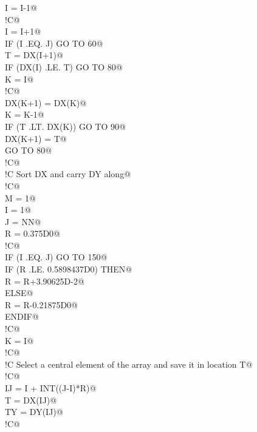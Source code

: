 \documentclass[10pt,a4paper,notitlepage]{article}
\begin{document}
\begin{flushleft}
\begin{list}{}{}
\mbox{}\verb@      I = I-1@\\
\mbox{}\verb@!C@\\
\mbox{} I = I+1@\\
\mbox{}\verb@      IF (I .EQ. J) GO TO 60@\\
\mbox{}\verb@      T = DX(I+1)@\\
\mbox{}\verb@      IF (DX(I) .LE. T) GO TO 80@\\
\mbox{}\verb@      K = I@\\
\mbox{}\verb@!C@\\
\mbox{} DX(K+1) = DX(K)@\\
\mbox{}\verb@      K = K-1@\\
\mbox{}\verb@      IF (T .LT. DX(K)) GO TO 90@\\
\mbox{}\verb@      DX(K+1) = T@\\
\mbox{}\verb@      GO TO 80@\\
\mbox{}\verb@!C@\\
\mbox{}\verb@!C     Sort DX and carry DY along@\\
\mbox{}\verb@!C@\\
\mbox{} M = 1@\\
\mbox{}\verb@      I = 1@\\
\mbox{}\verb@      J = NN@\\
\mbox{}\verb@      R = 0.375D0@\\
\mbox{}\verb@!C@\\
\mbox{} IF (I .EQ. J) GO TO 150@\\
\mbox{}\verb@      IF (R .LE. 0.5898437D0) THEN@\\
\mbox{}\verb@         R = R+3.90625D-2@\\
\mbox{}\verb@      ELSE@\\
\mbox{}\verb@         R = R-0.21875D0@\\
\mbox{}\verb@      ENDIF@\\
\mbox{}\verb@!C@\\
\mbox{} K = I@\\
\mbox{}\verb@!C@\\
\mbox{}\verb@!C     Select a central element of the array and save it in location T@\\
\mbox{}\verb@!C@\\
\mbox{}\verb@      IJ = I + INT((J-I)*R)@\\
\mbox{}\verb@      T = DX(IJ)@\\
\mbox{}\verb@      TY = DY(IJ)@\\
\mbox{}\verb@!C@\\

\end{list}
\end{flushleft}
\end{document}

